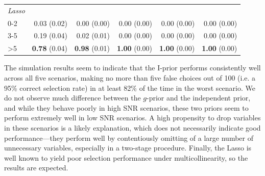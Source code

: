 \documentclass[a4paper,showframe,11pt]{report}
\begin{document}
\begin{table}[htb]
\begin{tabular}{lrrrrr}
\\
\emph{Lasso}\\
\hspace{0.5em}0-2 & 0.03 (0.02) & 0.00 (0.00) & 0.00 (0.00) & 0.00 (0.00) & 0.00 (0.00) \\
\hspace{0.5em}3-5 & 0.19 (0.04) & 0.02 (0.01) & 0.00 (0.00) & 0.00 (0.00) & 0.00 (0.00) \\
\hspace{0.5em}>5  & \textbf{0.78} (0.04) & \textbf{0.98} (0.01) & \textbf{1.00} (0.00) & \textbf{1.00} (0.00) & \textbf{1.00} (0.00) \\ 
\bottomrule
\end{tabular}
\end{table}

The simulation results seem to indicate that the I-prior performs consistently well across all five scenarios, making no more than five false choices out of 100 (i.e. a 95\% correct selection rate) in at least 82\% of the time in the worst scenario.
We do not observe much difference between the $g$-prior and the independent prior, and while they behave poorly in high SNR scenarios, these two priors seem to perform extremely well in low SNR scenarios.
A high propensity to drop variables in these scenarios is a likely explanation, which does not necessarily indicate good performance---they perform well by contentiously omitting of a large number of unnecessary variables, especially in a two-stage procedure.
Finally, the Lasso is well known to yield poor selection performance under multicollinearity, so the results are expected.
\end{document}
